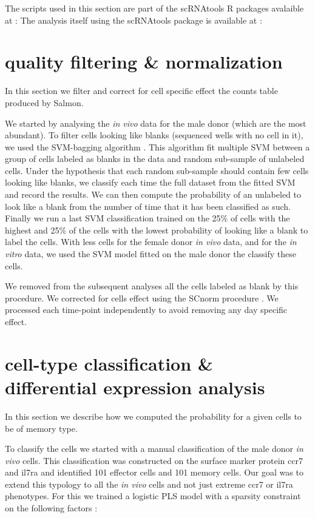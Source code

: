\documentclass[a4paper,12pt]{article}
\begin{document}
The scripts used in this section are part of the scRNAtools R packages avalaible at :
The analysis itself using the scRNAtools package is available at :

\section{quality filtering \& normalization}

In this section we filter and correct for cell specific effect the counts table produced by Salmon.

We started by analysing the {\it in vivo} data for the male donor (which are the most abundant).
To filter cells looking like blanks (sequenced wells with no cell in it), we used the SVM-bagging algorithm \cite{mordeletBaggingSVMLearn2014b}.
This algorithm fit multiple SVM between a group of cells labeled as blanks in the data and random sub-sample of unlabeled cells.
Under the hypothesis that each random sub-sample should contain few cells looking like blanks, we classify each time the full dataset from the fitted SVM and record the results.
We can then compute the probability of an unlabeled to look like a blank from the number of time that it has been classified as such.
Finally we run a last SVM classification trained on the 25\% of cells with the highest and 25\% of the cells with the lowest probability of looking like a blank to label the cells.
With less cells for the female donor {\it in vivo} data, and for the {\it in vitro} data, we used the SVM model fitted on the male donor the classify these cells.

We removed from the subsequent analyses all the cells labeled as blank by this procedure.
We corrected for cells effect using the SCnorm procedure \cite{bacherSCnormRobustNormalization2017e}.
We processed each time-point independently to avoid removing any day specific effect.

\section{cell-type classification \& differential expression analysis}

In this section we describe how we computed the probability for a given cells to be of memory type.

To classify the cells we started with a manual classification of the male donor {\it in vivo} cells.
This classification was constructed on the surface marker protein ccr7 and il7ra and identified 101 effector cells and 101 memory cells.
Our goal was to extend this typology to all the {\it in vivo} cells and not just extreme ccr7 or il7ra phenotypes.
For this we trained a logistic PLS model with a sparsity constraint on the following factors \cite{durifHighDimensionalClassification2018}:
\end{document}

